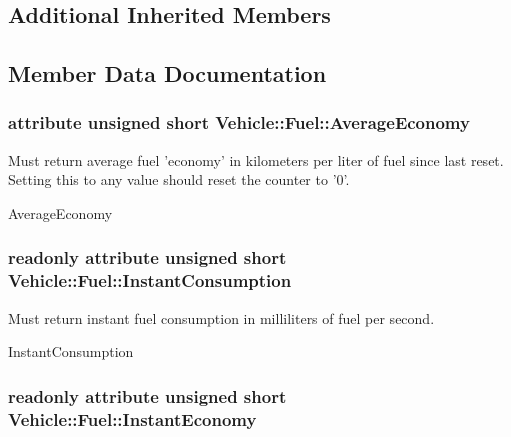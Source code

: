 \subsection*{Additional Inherited Members}


\subsection{Member Data Documentation}
\hypertarget{interfaceVehicle_1_1Fuel_aeb332abcbbb38663fe5e0f66436abcb2}{
\subsubsection[{Average\-Economy}]{\setlength{\rightskip}{0pt plus 5cm}attribute unsigned short Vehicle\-::\-Fuel\-::\-Average\-Economy}}\label{interfaceVehicle_1_1Fuel_aeb332abcbbb38663fe5e0f66436abcb2}


Must return average fuel 'economy' in kilometers per liter of fuel since last reset. Setting this to any value should reset the counter to '0'. 

Average\-Economy \hypertarget{interfaceVehicle_1_1Fuel_ad1e983a16428bf7c48726ebd934f70f5}{
\subsubsection[{Instant\-Consumption}]{\setlength{\rightskip}{0pt plus 5cm}readonly attribute unsigned short Vehicle\-::\-Fuel\-::\-Instant\-Consumption}}\label{interfaceVehicle_1_1Fuel_ad1e983a16428bf7c48726ebd934f70f5}


Must return instant fuel consumption in milliliters of fuel per second. 

Instant\-Consumption \hypertarget{interfaceVehicle_1_1Fuel_ae6204c7c634a6454afd2e0a269f30a1b}{
\subsubsection[{Instant\-Economy}]{\setlength{\rightskip}{0pt plus 5cm}readonly attribute unsigned short Vehicle\-::\-Fuel\-::\-Instant\-Economy}}\label{interfaceVehicle_1_1Fuel_ae6204c7c634a6454afd2e0a269f30a1b}


